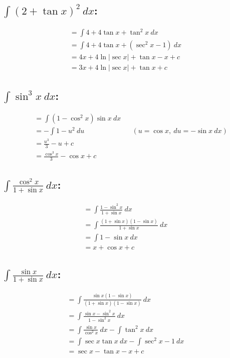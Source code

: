 \documentclass[MathsNotesBase.tex]{subfiles}
\begin{document}
  \subsection*{$\int{(2 + \tan{x})^2}\ dx$:}
   
  \begin{align*}
    &= \int{4 + 4\tan{x} + \tan^2{x}}\ dx && \\[8pt]
    &= \int{4 + 4\tan{x} + (\sec^2{x} - 1)}\ dx && \\[8pt]
    &= 4x + 4\ln{\lvert\sec{x}\rvert} + \tan{x} - x + c && \\[8pt]
    &= 3x + 4\ln{\lvert\sec{x}\rvert} + \tan{x} + c
  \end{align*}
  
  
  \subsection*{$\int{\sin^3{x}}\ dx$:}
   
  \begin{align*}
    &= \int{(1 - \cos^2{x})\sin{x}}\ dx && \\[8pt]
    &= -\int{1 - u^2}\ du && (u = \cos{x},\ du = -\sin{x}\ dx)  \\[8pt]
    &= \frac{u^3}{3} - u + c && \\[8pt]
    &= \frac{\cos^3{x}}{3} - \cos{x} + c
  \end{align*}
  
  
  \subsection*{$\int{\frac{\cos^2{x}}{1 + \sin{x}}}\ dx$:}
   
  \begin{align*}
    &= \int{\frac{1 - \sin^2{x}}{1 + \sin{x}}}\ dx && \\[8pt]
    &= \int{\frac{(1 + \sin{x})(1 - \sin{x})}{1 + \sin{x}}}\ dx && \\[8pt]
    &= \int{1 - \sin{x}}\ dx && \\[8pt]
    &= x + \cos{x} + c
  \end{align*}
  
  
  \subsection*{$\int{\frac{\sin{x}}{1 + \sin{x}}}\ dx$:}
   
  \begin{align*}
    &= \int{\frac{\sin{x}(1 - \sin{x})}{(1 + \sin{x})(1 - \sin{x})}}\ dx && \\[8pt]
    &= \int{\frac{\sin{x} - \sin^2{x}}{1 - \sin^2{x}}}\ dx && \\[8pt]
    &= \int{\frac{\sin{x}}{\cos^2{x}}}\ dx - \int{\tan^2{x}}\ dx && \\[8pt]
    &= \int{\sec{x}\tan{x}}\ dx - \int{\sec^2{x} - 1}\ dx && \\[8pt]
    &= \sec{x} - \tan{x} - x + c
  \end{align*}
  
\end{document}
